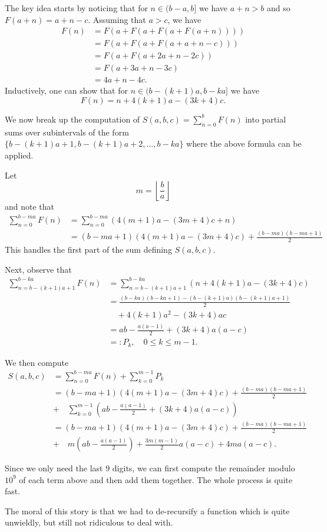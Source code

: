 The key idea starts by noticing that for \(n \in (b - a, b]\) we have \(a + n > b\) and so \(F(a + n) = a + n -c\). Assuming that \(a > c\), we have \begin{align} F(n) & = F(a + F(a + F(a + F(a + n))))\\ & = F(a + F(a + F(a + a+n-c)))\\ & = F(a + F(a + 2a + n - 2c)) \\ & = F(a + 3a + n - 3c) \\ & = 4a + n - 4c. \end{align} Inductively, one can show that for \(n \in (b - (k+1)a, b -ka]\) we have \[F(n) = n + 4(k+1)a - (3k + 4)c.\]

We now break up the computation of \(S(a,b,c) = \sum_{n=0}^{b}F(n)\) into partial sums over subintervals of the form \( \{ b-(k+1)a + 1, b-(k+1)a + 2, \ldots, b-ka\} \) where the above formula can be applied.

Let \[m = \left\lfloor \frac{b}{a} \right\rfloor \] and note that \begin{align} \sum_{n=0}^{b - ma} F(n) & = \sum_{n=0}^{b-ma}\left(4(m+1)a - (3m+4)c + n \right)\\ & = (b - ma + 1)(4(m+1)a - (3m+4)c) + \frac{(b-ma)(b-ma+1)}{2} \end{align} This handles the first part of the sum defining \(S(a,b,c)\).

Next, observe that \begin{align} \sum_{n=b - (k+1)a +1}^{b-ka}F(n) & = \sum_{n=b - (k+1)a +1}^{b-ka}\left( n + 4(k+1)a - (3k + 4)c\right)\\ & = \frac{(b-ka)(b-ka + 1) - (b - (k+1)a)(b - (k+1)a + 1)}{2}\\ & \quad + 4(k+1)a^{2} - (3k + 4)ac\\ & = ab - \frac{a(a-1)}{2} + (3k+4)a(a - c)\\ & =: P_{k}, \quad 0 \leq k \leq m-1.
\end{align}

We then compute \begin{align} S(a,b,c) & = \sum_{n=0}^{b - ma}F(n) + \sum_{k=0}^{m-1}P_{k}\\ & = (b - ma + 1)(4(m+1)a - (3m+4)c) + \frac{(b-ma)(b-ma+1)}{2}\\ & + \quad \sum_{k=0}^{m-1}\left(ab - \frac{a(a-1)}{2} + (3k+4)a(a - c)\right)\\ & = (b - ma + 1)(4(m+1)a - (3m+4)c) + \frac{(b-ma)(b-ma+1)}{2}\\ & + \quad m\left(ab - \frac{a(a-1)}{2} \right) + \frac{3m(m-1)}{2}a(a-c) + 4ma(a-c). \end{align}

Since we only need the last \(9\) digits, we can first compute the remainder modulo \(10^{9}\) of each term above and then add them together. The whole process is quite fast.

The moral of this story is that we had to de-recursify a function which is quite unwieldly, but still not ridiculous to deal with.
